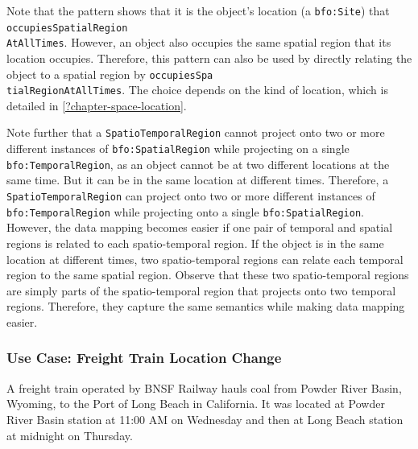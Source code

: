 Note that the pattern shows that it is the object's location (a \texttt{bfo:Site}) that \texttt{occupiesSpatialRegion\\AtAllTimes}. However, an object also occupies the same spatial region that its location occupies. Therefore, this pattern can also be used by directly relating the object to a spatial region by \texttt{occupiesSpa\\tialRegionAtAllTimes}. The choice depends on the kind of location, which is detailed in \cref{?chapter-space-location}.   

Note further that a \texttt{SpatioTemporalRegion} cannot project onto two or more different instances of \texttt{bfo:SpatialRegion} while projecting on a single \texttt{bfo:TemporalRegion}, as an object cannot be at two different locations at the same time. But it can be in the same location at different times. Therefore, a \texttt{SpatioTemporalRegion} can project onto two or more different instances of \texttt{bfo:TemporalRegion} while projecting onto a single \texttt{bfo:SpatialRegion}. However, the data mapping becomes easier if one pair of temporal and spatial regions is related to each spatio-temporal region. If the object is in the same location at different times, two spatio-temporal regions can relate each temporal region to the same spatial region. Observe that these two spatio-temporal regions are simply parts of the spatio-temporal region that projects onto two temporal regions. Therefore, they capture the same semantics while making data mapping easier.     

\subsubsection*{Use Case: Freight Train Location Change} 
A freight train operated by BNSF Railway hauls coal from Powder River Basin, Wyoming, to the Port of Long Beach in California. It was located at Powder River Basin station at 11:00 AM on Wednesday and then at Long Beach station at midnight on Thursday.

